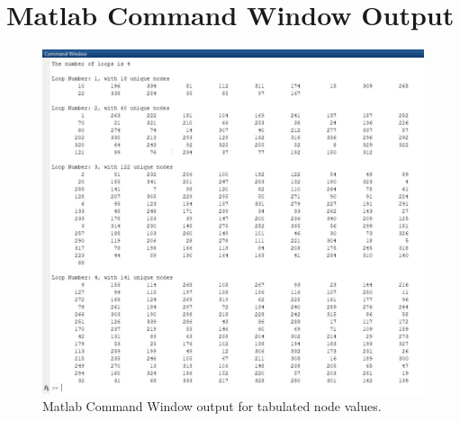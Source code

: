 \documentclass[12pt]{extarticle}
\begin{document}
                \section*{Matlab Command Window Output}
                \begin{figure}[h]
                        \centering
                        \includegraphics[width = 0.9\linewidth]{q4/q4_matlab_output.JPG}
                        \caption{Matlab Command Window output for tabulated node values.}
                        \label{fig:q4_matlab_output}
                \end{figure}
                
\end{document}
